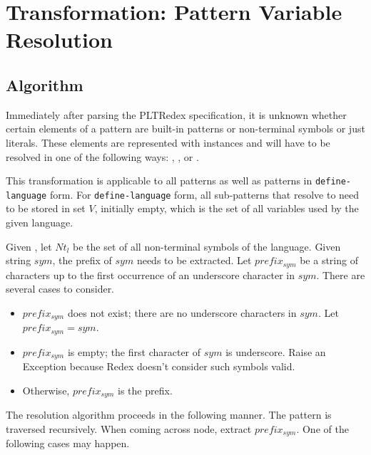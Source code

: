 \section{Transformation: Pattern Variable Resolution}
\label{section:pv-resolve}

\subsection{Algorithm}

Immediately after parsing the PLTRedex specification, it is unknown whether certain elements of a pattern are built-in patterns or non-terminal symbols or just literals. These elements are represented with \UnresolvedSymbol instances and will have to be resolved in one of the following ways: \BuiltInPatternNoArg, \NonTerminalNoArg, or \LiteralPatternNoArg.

This transformation is applicable to all patterns as well as patterns in \texttt{define-language} form. For \texttt{define-language} form, all sub-patterns that resolve to \LiteralPatternNoArg need to be stored in set $V$, initially empty, which is the set of all variables used by the given language.

Given , let $Nt_{l}$ be the set of all non-terminal symbols of the language. Given string $sym$, the prefix of $sym$ needs to be extracted. Let $prefix_{sym}$ be a string of characters up to the first occurrence of an underscore character in $sym$. There are several cases to consider.

\begin{itemize}
\item $prefix_{sym}$ does not exist; there are no underscore characters in $sym$. Let $prefix_{sym}=sym$.
\item $prefix_{sym}$ is empty; the first character of $sym$ is underscore. Raise an Exception because Redex doesn't consider such symbols valid.
\item Otherwise, $prefix_{sym}$ is the prefix.
\end{itemize}

The resolution algorithm proceeds in the following manner. The pattern is traversed recursively. When coming across \UnresolvedSymbol node, extract $prefix_{sym}$. One of the following cases may happen.


